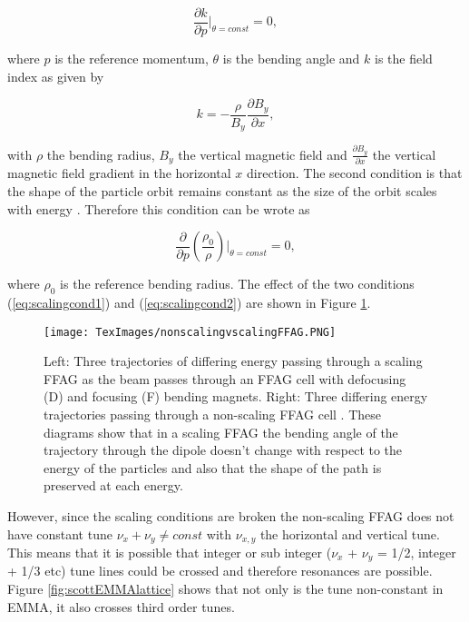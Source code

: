 \documentclass[11pt]{article}
\begin{document}
\begin{equation}
\frac{\partial k}{\partial p}\bigg|_{\theta=const} = 0,
\label{eq:scalingcond1}
\end{equation}

\noindent where $p$ is the reference momentum, $\theta$ is the bending angle and $k$ is the field index as given by

\begin{equation}
k=-\frac{\rho}{B_{y}}\frac{\partial B_{y}}{\partial x},
\label{eq:fieldindex}
\end{equation}

\noindent with  $\rho$ the bending radius, $B_{y}$ the vertical magnetic field and $\frac{\partial B_{y}}{\partial x}$ the vertical magnetic field gradient in the horizontal $x$ direction. The second condition is that the shape of the particle orbit remains constant as the size of the orbit scales with energy \cite{sheehyFFAG}. Therefore this condition can be wrote as

\begin{equation}
\frac{\partial}{\partial p}\left(\frac{\rho_{0}}{\rho}\right)\bigg|_{\theta=const} = 0,
\label{eq:scalingcond2}
\end{equation}

\noindent where $\rho_{0}$ is the reference bending radius. The effect of the two conditions (\ref{eq:scalingcond1}) and (\ref{eq:scalingcond2}) are shown in Figure \ref{fig:scalingvnon}.

\begin{figure}[H]
\centering
\texttt{[image: TexImages/nonscalingvscalingFFAG.PNG]}
\caption{\label{fig:scalingvnon} Left: Three trajectories of differing energy passing through a scaling FFAG as the beam passes through an FFAG cell with defocusing (D) and focusing (F) bending magnets. Right: Three differing energy trajectories passing through a non-scaling FFAG cell \cite{CIFFAGlec}. These diagrams show that in a scaling FFAG the bending angle of the trajectory through the dipole doesn't change with respect to the energy of the particles and also that the shape of the path is preserved at each energy.}
\end{figure}

However, since the scaling conditions are broken the non-scaling FFAG does not have constant tune $\nu_{x} + \nu_{y} \neq const$ with $\nu_{x,y}$ the horizontal and vertical tune. This means that it is possible that integer or sub integer ($\nu_{x}$ + $\nu_{y}$ = 1/2, integer + 1/3 etc) tune lines could be crossed and therefore resonances are possible. Figure \ref{fig:scottEMMAlattice} shows that not only is the tune non-constant in EMMA, it also crosses third order tunes. 
\end{document}
